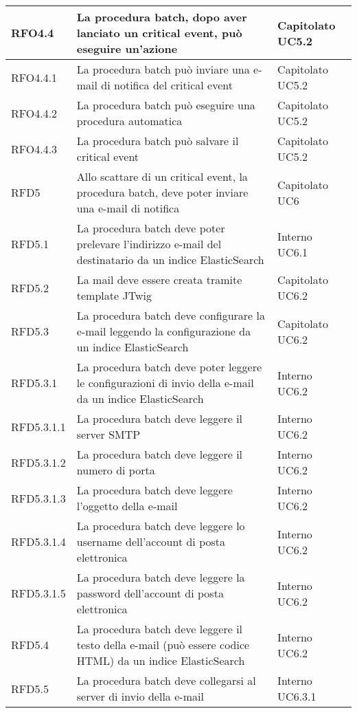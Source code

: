 \begin{center}
\begin{longtable}{ | >{\centering\arraybackslash}m{2.5cm} | >{\centering\arraybackslash}m{8cm} | >{\centering\arraybackslash}m{2.5cm} | }
       	RFO4.4 & La procedura batch, dopo aver lanciato un critical event, può eseguire un'azione & Capitolato UC5.2\\ \hline
       	RFO4.4.1 & La procedura batch può inviare una e-mail di notifica del critical event & Capitolato UC5.2\\ \hline
       	RFO4.4.2 & La procedura batch può eseguire una procedura automatica & Capitolato UC5.2\\ \hline
       	RFO4.4.3 & La procedura batch può salvare il critical event & Capitolato UC5.2\\ \hline
       	RFD5 & Allo scattare di un critical event, la procedura batch, deve poter inviare una e-mail di notifica & Capitolato UC6\\ \hline
       	RFD5.1 & La procedura batch deve poter prelevare l'indirizzo e-mail del destinatario da un indice ElasticSearch & Interno UC6.1 \\ \hline
       	RFD5.2 & La mail deve essere creata tramite template JTwig & Capitolato UC6.2\\ \hline
       	RFD5.3 & La procedura batch deve configurare la e-mail leggendo la configurazione da un indice ElasticSearch & Capitolato UC6.2\\ \hline
       	RFD5.3.1 & La procedura batch deve poter leggere le configurazioni di invio della e-mail da un indice ElasticSearch & Interno UC6.2\\ \hline
       	RFD5.3.1.1 & La procedura batch deve leggere il server SMTP & Interno UC6.2\\ \hline
       	RFD5.3.1.2 & La procedura batch deve leggere il numero di porta & Interno UC6.2\\ \hline
       	RFD5.3.1.3 & La procedura batch deve leggere l'oggetto della e-mail & Interno UC6.2\\ \hline
       	RFD5.3.1.4 & La procedura batch deve leggere lo username dell'account di posta elettronica & Interno UC6.2\\ 	\hline
       	RFD5.3.1.5 & La procedura batch deve leggere la password dell'account di posta elettronica & Interno UC6.2\\ \hline
       	RFD5.4 & La procedura batch deve leggere il testo della e-mail (può essere codice HTML) da un indice ElasticSearch & Interno UC6.2\\ \hline
       	RFD5.5 & La procedura batch deve collegarsi al server di invio della e-mail & Interno UC6.3.1\\ \hline
       	

\end{longtable}
\end{center}
